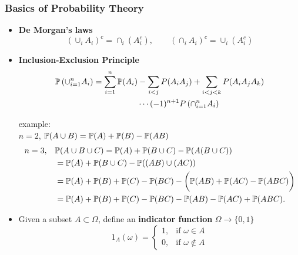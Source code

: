 \documentclass[english,10pt,handout]{beamer}
\begin{document}
\begin{frame}
\frametitle{Basics of Probability Theory}
\begin{itemize}

\item 
{\bf De Morgan's laws}
\[ (\cup_i A_i)^c = \cap_i (A_i^c), \qquad 
(\cap_i A_i)^c = \cup_i (A_i^c)\]

\item 
 {\bf Inclusion-Exclusion Principle}
\[
\begin{split}
\mathbb{P}\left(\cup_{i=1}^n A_i \right) = \sum_{i=1}^n \mathbb{P}(A_i)
& -\sum_{i<j} P(A_iA_j)
 + \sum_{i<j<k} P(A_iA_jA_k)
 \\& \cdots 
 (-1)^{n+1} P\left(\cap_{i=1}^n A_i\right)
 \end{split}\]
 
example:
\\
$n=2$, $\mathbb{P}(A\cup B)=\mathbb{P}(A)+\mathbb{P}(B)-\mathbb{P}(AB)$ 
\[
\begin{split}
n=3, \quad &\mathbb{P}(A\cup B \cup C)=\mathbb{P}(A)+\mathbb{P}(B\cup C)-\mathbb{P}(A(B\cup C)) \\
&=\mathbb{P}(A)+\mathbb{P}(B\cup C)-\mathbb{P}((AB) \cup  (AC)) \\
&=\mathbb{P}(A)+\mathbb{P}(B) + \mathbb{P}(C)-\mathbb{P}(BC)-
\bigg(\mathbb{P}(AB)  + \mathbb{P}(AC) - \mathbb{P}(ABC) \bigg)\\
&=\mathbb{P}(A)+\mathbb{P}(B) + \mathbb{P}(C)-\mathbb{P}(BC)-\mathbb{P}(AB)  - \mathbb{P}(AC)+ \mathbb{P}(ABC).
\end{split}
\]
\item 
Given a subset $A\subset \Omega$, 
define an {\bf  indicator function}  $\Omega \to \{0,1\}$
\[
1_{A}(\omega)= 
\begin{cases}1, & \mbox{if } \omega \in A \\
0, &\mbox{if } \omega \notin A 
\end{cases}
\]

%
%
%
%
%
\end{itemize}


\end{frame}
  
\end{document}
